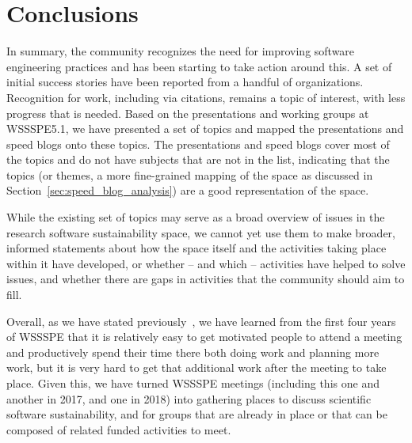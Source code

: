 \documentclass[11pt,letterpaper]{article}
\newcommand{\LXnote}[1]{  {\textcolor{orange}      { ***Alex: #1 }}}
\begin{document}
\section{Conclusions} \label{sec:conclusions}

In summary, the community recognizes the need for improving software engineering practices and has been starting to take action around this. A set of initial success stories have been reported from a handful of organizations. Recognition for work, including via citations, remains a topic of interest, with less progress that is needed. 
%
Based on the presentations and working groups at WSSSPE5.1, we have presented a set of topics and mapped the %
presentations and speed blogs onto these topics. The presentations and speed blogs cover most of the topics and do not have subjects that are not in the list, indicating that the topics (or themes, a more fine-grained mapping of the space as discussed in Section~\ref{sec:speed_blog_analysis}) are a good representation of the space.

While the existing set of topics may serve as a broad overview of issues in the research software sustainability space, we cannot yet use them to make broader, informed statements about how the space itself and the activities taking place within it have developed, or whether -- and which -- activities have helped to solve issues, and whether there are gaps in activities that the community should aim to fill.

Overall, as we have stated previously~\cite{WSSSPE4-paper}, we have learned from the first four years of WSSSPE that it is relatively easy to get motivated people to attend a meeting and productively spend their time there both doing work and planning more work, but it is very hard to get that additional work after the meeting to take place. Given this, we have turned WSSSPE meetings (including this one and another in 2017, and one in 2018) into gathering places to discuss scientific software sustainability, and for groups that are already in place or that can be composed of related funded activities to meet.


\end{document}
